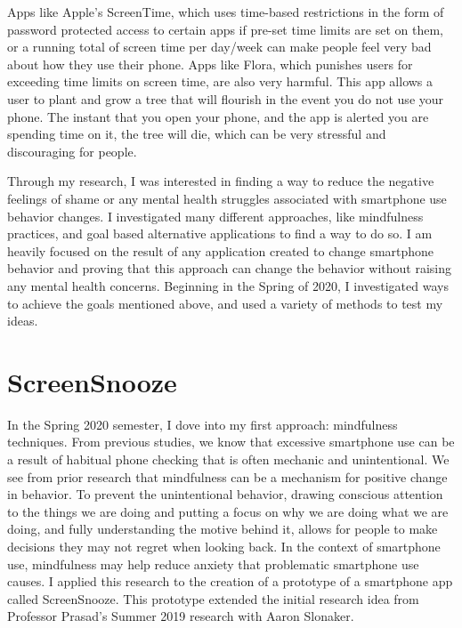 \documentclass[12pt, title page, manuscript, nonacm]{acmart}
\begin{document}
\par Apps like Apple’s ScreenTime\cite{babic2017longitudinal}, which uses time-based restrictions in the form of password protected access to certain apps if pre-set time limits are set on them, or a running total of screen time per day/week can make people feel very bad about how they use their phone. Apps like Flora, which punishes users for exceeding time limits on screen time, are also very harmful\cite{elhai2017problematic}. This app allows a user to plant and grow a tree that will flourish in the event you do not use your phone. The instant that you open your phone, and the app is alerted you are spending time on it, the tree will die, which can be very stressful and discouraging for people\cite{borghouts2020timetofocus}. \par Through my research, I was interested in finding a way to reduce the negative feelings of shame or any mental health struggles associated with smartphone use behavior changes\cite{diefenbach2019smartphone}. I investigated many different approaches, like mindfulness practices, and goal based alternative applications to find a way to do so\cite{keller2021mobile}. I am heavily focused on the result of any application created to change smartphone behavior and proving that this approach can change the behavior without raising any mental health concerns\cite{pinder2019push}. Beginning in the Spring of 2020, I investigated ways to achieve the goals mentioned above, and used a variety of methods to test my ideas\cite{monge2019race}.
\section*{ScreenSnooze}
In the Spring 2020 semester, I dove into my first approach: mindfulness techniques\cite{regan2020does}. From previous studies, we know that excessive smartphone use can be a result of habitual phone checking that is often mechanic and unintentional\cite{heras2021neither}. We see from prior research that mindfulness can be a mechanism for positive change in behavior. To prevent the unintentional behavior, drawing conscious attention to the things we are doing and putting a focus on why we are doing what we are doing, and fully understanding the motive behind it, allows for people to make decisions they may not regret when looking back. In the context of smartphone use, mindfulness may help reduce anxiety\cite{zhang2015effectiveness} that problematic smartphone use causes. I applied this research to the creation of a prototype of a smartphone app called ScreenSnooze. This prototype extended the initial research idea from Professor Prasad's Summer 2019 research with Aaron Slonaker.
\end{document}
